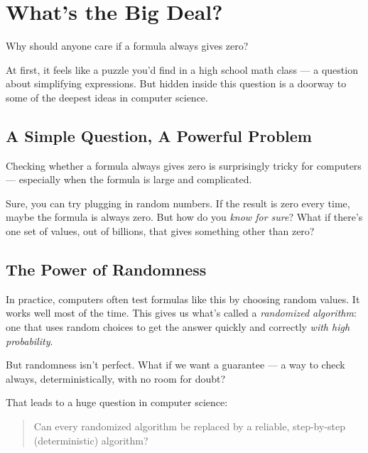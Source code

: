 \section{What’s the Big Deal?}

Why should anyone care if a formula always gives zero?

At first, it feels like a puzzle you'd find in a high school math class — a question about simplifying expressions. But hidden inside this question is a doorway to some of the deepest ideas in computer science.

\subsection*{A Simple Question, A Powerful Problem}

Checking whether a formula always gives zero is surprisingly tricky for computers — especially when the formula is large and complicated.

Sure, you can try plugging in random numbers. If the result is zero every time, maybe the formula is always zero. But how do you \textit{know for sure}? What if there's one set of values, out of billions, that gives something other than zero?

\subsection*{The Power of Randomness}

In practice, computers often test formulas like this by choosing random values. It works well most of the time. This gives us what's called a \textit{randomized algorithm}: one that uses random choices to get the answer quickly and correctly \textit{with high probability}.

But randomness isn't perfect. What if we want a guarantee — a way to check always, deterministically, with no room for doubt?

That leads to a huge question in computer science:

\begin{quote}
Can every randomized algorithm be replaced by a reliable, step-by-step (deterministic) algorithm?
\end{quote}